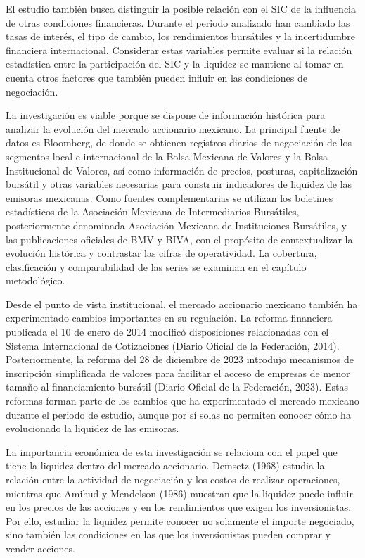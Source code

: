 El estudio también busca distinguir la posible relación con el SIC de la influencia de otras condiciones financieras. Durante el periodo analizado han cambiado las tasas de interés, el tipo de cambio, los rendimientos bursátiles y la incertidumbre financiera internacional. Considerar estas variables permite evaluar si la relación estadística entre la participación del SIC y la liquidez se mantiene al tomar en cuenta otros factores que también pueden influir en las condiciones de negociación.

La investigación es viable porque se dispone de información histórica para analizar la evolución del mercado accionario mexicano. La principal fuente de datos es Bloomberg, de donde se obtienen registros diarios de negociación de los segmentos local e internacional de la Bolsa Mexicana de Valores y la Bolsa Institucional de Valores, así como información de precios, posturas, capitalización bursátil y otras variables necesarias para construir indicadores de liquidez de las emisoras mexicanas. Como fuentes complementarias se utilizan los boletines estadísticos de la Asociación Mexicana de Intermediarios Bursátiles, posteriormente denominada Asociación Mexicana de Instituciones Bursátiles, y las publicaciones oficiales de BMV y BIVA, con el propósito de contextualizar la evolución histórica y contrastar las cifras de operatividad. La cobertura, clasificación y comparabilidad de las series se examinan en el capítulo metodológico.

Desde el punto de vista institucional, el mercado accionario mexicano también ha experimentado cambios importantes en su regulación. La reforma financiera publicada el 10 de enero de 2014 modificó disposiciones relacionadas con el Sistema Internacional de Cotizaciones (Diario Oficial de la Federación, 2014). Posteriormente, la reforma del 28 de diciembre de 2023 introdujo mecanismos de inscripción simplificada de valores para facilitar el acceso de empresas de menor tamaño al financiamiento bursátil (Diario Oficial de la Federación, 2023). Estas reformas forman parte de los cambios que ha experimentado el mercado mexicano durante el periodo de estudio, aunque por sí solas no permiten conocer cómo ha evolucionado la liquidez de las emisoras.

La importancia económica de esta investigación se relaciona con el papel que tiene la liquidez dentro del mercado accionario. Demsetz (1968) estudia la relación entre la actividad de negociación y los costos de realizar operaciones, mientras que Amihud y Mendelson (1986) muestran que la liquidez puede influir en los precios de las acciones y en los rendimientos que exigen los inversionistas. Por ello, estudiar la liquidez permite conocer no solamente el importe negociado, sino también las condiciones en las que los inversionistas pueden comprar y vender acciones.


